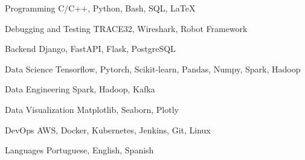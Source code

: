 

\begin{cvskills}

  \cvskill
    {Programming} %
    {C/C++, Python, Bash, SQL, LaTeX} %

  \cvskill
    {Debugging and Testing} %
    {TRACE32, Wireshark, Robot Framework} %

  \cvskill
    {Backend} %
    {Django, FastAPI, Flask, PostgreSQL} %

  \cvskill
    {Data Science} %
    {Tensorflow, Pytorch, Scikit-learn, Pandas, Numpy, Spark, Hadoop} %

  \cvskill
    {Data Engineering} %
    {Spark, Hadoop, Kafka} %

  \cvskill
    {Data Visualization} %
    {Matplotlib, Seaborn, Plotly} %

  \cvskill
    {DevOps} %
    {AWS, Docker, Kubernetes, Jenkins, Git, Linux} %
    

  \cvskill
    {Languages} %
    {Portuguese, English, Spanish} %
    
\end{cvskills}
